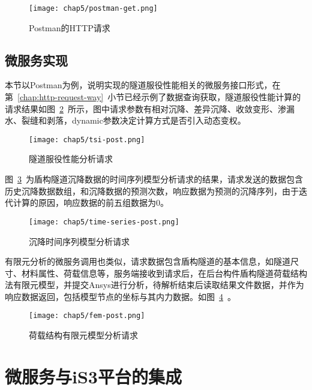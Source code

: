 \begin{figure}[htb!]
    \centering
    \texttt{[image: chap5/postman-get.png]}
    \caption{Postman的HTTP请求}
    \label{fig:Postman的HTTP请求}
\end{figure}

\subsection{微服务实现}

本节以Postman为例，说明实现的隧道服役性能相关的微服务接口形式，在第~\ref{chap:http-request-way}~小节已经示例了数据查询获取，隧道服役性能计算的请求结果如图~\ref{fig:隧道服役性能分析请求}~所示，图中请求参数有相对沉降、差异沉降、收敛变形、渗漏水、裂缝和剥落，dynamic参数决定计算方式是否引入动态变权。

\begin{figure}[htb!]
    \centering
    \texttt{[image: chap5/tsi-post.png]}
    \caption{隧道服役性能分析请求}
    \label{fig:隧道服役性能分析请求}
\end{figure}

图~\ref{fig:沉降时间序列模型分析请求}~为盾构隧道沉降数据的时间序列模型分析请求的结果，请求发送的数据包含历史沉降数据数组，和沉降数据的预测次数，响应数据为预测的沉降序列，由于迭代计算的原因，响应数据的前五组数据为0。

\begin{figure}[htb!]
    \centering
    \texttt{[image: chap5/time-series-post.png]}
    \caption{沉降时间序列模型分析请求}
    \label{fig:沉降时间序列模型分析请求}
\end{figure}

有限元分析的微服务调用也类似，请求数据包含盾构隧道的基本信息，如隧道尺寸、材料属性、荷载信息等，服务端接收到请求后，在后台构件盾构隧道荷载结构法有限元模型，并提交Ansys进行分析，待解析结束后读取结果文件数据，并作为响应数据返回，包括模型节点的坐标与其内力数据。如图~\ref{fig:荷载结构有限元模型分析请求}~。

\begin{figure}[htb!]
    \centering
    \texttt{[image: chap5/fem-post.png]}
    \caption{荷载结构有限元模型分析请求}
    \label{fig:荷载结构有限元模型分析请求}
\end{figure}

\section{微服务与iS3平台的集成}

